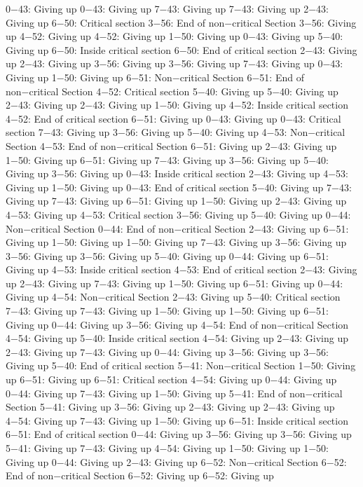 0−43: Giving up
0−43: Giving up
7−43: Giving up
7−43: Giving up
2−43: Giving up
6−50: Critical section
3−56: End of non−critical Section
3−56: Giving up
4−52: Giving up
4−52: Giving up
1−50: Giving up
0−43: Giving up
5−40: Giving up
6−50: Inside critical section
6−50: End of critical section
2−43: Giving up
2−43: Giving up
3−56: Giving up
3−56: Giving up
7−43: Giving up
0−43: Giving up
1−50: Giving up
6−51: Non−critical Section
6−51: End of non−critical Section
4−52: Critical section
5−40: Giving up
5−40: Giving up
2−43: Giving up
2−43: Giving up
1−50: Giving up
4−52: Inside critical section
4−52: End of critical section
6−51: Giving up
0−43: Giving up
0−43: Critical section
7−43: Giving up
3−56: Giving up
5−40: Giving up
4−53: Non−critical Section
4−53: End of non−critical Section
6−51: Giving up
2−43: Giving up
1−50: Giving up
6−51: Giving up
7−43: Giving up
3−56: Giving up
5−40: Giving up
3−56: Giving up
0−43: Inside critical section
2−43: Giving up
4−53: Giving up
1−50: Giving up
0−43: End of critical section
5−40: Giving up
7−43: Giving up
7−43: Giving up
6−51: Giving up
1−50: Giving up
2−43: Giving up
4−53: Giving up
4−53: Critical section
3−56: Giving up
5−40: Giving up
0−44: Non−critical Section
0−44: End of non−critical Section
2−43: Giving up
6−51: Giving up
1−50: Giving up
1−50: Giving up
7−43: Giving up
3−56: Giving up
3−56: Giving up
3−56: Giving up
5−40: Giving up
0−44: Giving up
6−51: Giving up
4−53: Inside critical section
4−53: End of critical section
2−43: Giving up
2−43: Giving up
7−43: Giving up
1−50: Giving up
6−51: Giving up
0−44: Giving up
4−54: Non−critical Section
2−43: Giving up
5−40: Critical section
7−43: Giving up
7−43: Giving up
1−50: Giving up
1−50: Giving up
6−51: Giving up
0−44: Giving up
3−56: Giving up
4−54: End of non−critical Section
4−54: Giving up
5−40: Inside critical section
4−54: Giving up
2−43: Giving up
2−43: Giving up
7−43: Giving up
0−44: Giving up
3−56: Giving up
3−56: Giving up
5−40: End of critical section
5−41: Non−critical Section
1−50: Giving up
6−51: Giving up
6−51: Critical section
4−54: Giving up
0−44: Giving up
0−44: Giving up
7−43: Giving up
1−50: Giving up
5−41: End of non−critical Section
5−41: Giving up
3−56: Giving up
2−43: Giving up
2−43: Giving up
4−54: Giving up
7−43: Giving up
1−50: Giving up
6−51: Inside critical section
6−51: End of critical section
0−44: Giving up
3−56: Giving up
3−56: Giving up
5−41: Giving up
7−43: Giving up
4−54: Giving up
1−50: Giving up
1−50: Giving up
0−44: Giving up
2−43: Giving up
6−52: Non−critical Section
6−52: End of non−critical Section
6−52: Giving up
6−52: Giving up
